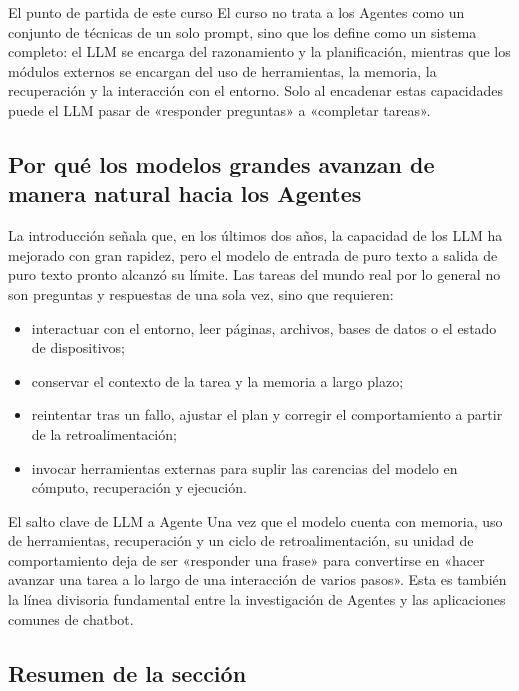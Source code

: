 \documentclass[a4paper]{article}
\begin{document}
\begin{knowledgebox}{El punto de partida de este curso}
El curso no trata a los Agentes como un conjunto de técnicas de un solo prompt, sino que los define como un sistema completo: el LLM se encarga del razonamiento y la planificación, mientras que los módulos externos se encargan del uso de herramientas, la memoria, la recuperación y la interacción con el entorno. Solo al encadenar estas capacidades puede el LLM pasar de «responder preguntas» a «completar tareas».
\end{knowledgebox}

\subsection{Por qué los modelos grandes avanzan de manera natural hacia los Agentes}

La introducción señala que, en los últimos dos años, la capacidad de los LLM ha mejorado con gran rapidez, pero el modelo de entrada de puro texto a salida de puro texto pronto alcanzó su límite. Las tareas del mundo real por lo general no son preguntas y respuestas de una sola vez, sino que requieren:
\begin{itemize}
    \item interactuar con el entorno, leer páginas, archivos, bases de datos o el estado de dispositivos;
    \item conservar el contexto de la tarea y la memoria a largo plazo;
    \item reintentar tras un fallo, ajustar el plan y corregir el comportamiento a partir de la retroalimentación;
    \item invocar herramientas externas para suplir las carencias del modelo en cómputo, recuperación y ejecución.
\end{itemize}

\begin{importantbox}{El salto clave de LLM a Agente}
Una vez que el modelo cuenta con memoria, uso de herramientas, recuperación y un ciclo de retroalimentación, su unidad de comportamiento deja de ser «responder una frase» para convertirse en «hacer avanzar una tarea a lo largo de una interacción de varios pasos». Esta es también la línea divisoria fundamental entre la investigación de Agentes y las aplicaciones comunes de chatbot.
\end{importantbox}

\subsection{Resumen de la sección}
\end{document}
